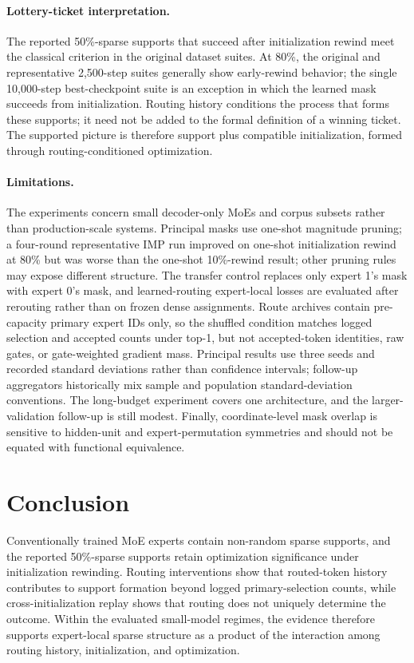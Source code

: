 \documentclass{article}
\begin{document}
\paragraph{Lottery-ticket interpretation.}
The reported 50\%-sparse supports that succeed after initialization rewind meet
the classical criterion in the original dataset suites. At 80\%, the original
and representative 2,500-step suites generally show early-rewind behavior; the
single 10,000-step best-checkpoint suite is an exception in which the learned
mask succeeds from initialization. Routing history conditions the process that
forms these supports; it need not be added to the formal definition of a
winning ticket. The supported picture is therefore support plus compatible
initialization, formed through routing-conditioned optimization.

\paragraph{Limitations.}
The experiments concern small decoder-only MoEs and corpus subsets rather than
production-scale systems. Principal masks use one-shot magnitude pruning; a
four-round representative IMP run improved on one-shot initialization rewind
at 80\% but was worse than the one-shot 10\%-rewind result; other pruning rules
may expose different structure. The transfer control replaces only expert 1's
mask with expert 0's mask, and learned-routing expert-local losses are evaluated
after rerouting rather than on frozen dense assignments. Route archives contain
pre-capacity primary expert IDs only, so the shuffled condition matches logged
selection and accepted counts under top-1, but not accepted-token identities,
raw gates, or gate-weighted gradient mass.
Principal results use three seeds and recorded standard deviations rather than
confidence intervals; follow-up aggregators historically mix sample and
population standard-deviation conventions. The long-budget experiment covers
one architecture, and the larger-validation follow-up is still modest. Finally,
coordinate-level mask overlap is sensitive to hidden-unit and expert-permutation
symmetries and should not be equated with functional equivalence.

\section{Conclusion}
\label{sec:conclusion}

Conventionally trained MoE experts contain non-random sparse supports, and the
reported 50\%-sparse supports retain optimization significance under
initialization rewinding. Routing interventions show that routed-token history
contributes to support formation beyond logged primary-selection counts, while
cross-initialization replay shows that routing does not uniquely determine the
outcome. Within the evaluated small-model regimes, the evidence therefore
supports expert-local sparse structure as a product of the interaction among
routing history, initialization, and optimization.
\end{document}
